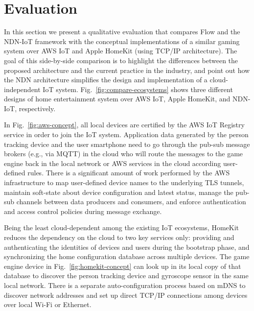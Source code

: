 \section{Evaluation}
\label{sec:eval}

In this section we present a qualitative evaluation that compares Flow and the NDN-IoT framework with the conceptual implementations of a similar gaming system over AWS IoT and Apple HomeKit (using TCP/IP architecture).
The goal of this side-by-side comparison is to highlight the differences between the proposed architecture and the current practice in the industry, and point out how the NDN architecture simplifies the design and implementation of a cloud-independent IoT system.
Fig.~\ref{fig:compare-ecosystems} shows three different designs of home entertainment system over AWS IoT, Apple HomeKit, and NDN-IoT, respectively.

\begin{figure*}[!t]
\centering
{}
\hfil
{}
\hfil
{}
\caption{Comparison of IoT-enabled home entertainment systems over different ecosystems.}
\label{fig:compare-ecosystems}
\end{figure*}

In Fig.~\ref{fig:aws-concept}, all local devices are certified by the AWS IoT Registry service in order to join the IoT system.
Application data generated by the person tracking device and the user smartphone need to go through the pub-sub message brokers (e.g., via MQTT) in the cloud who will route the messages to the game engine back in the local network or AWS services in the cloud according user-defined rules.
There is a significant amount of work performed by the AWS infrastructure to map user-defined device names to the underlying TLS tunnels, maintain soft-state about device configuration and latest status, manage the pub-sub channels between data producers and consumers, and enforce authentication and access control policies during message exchange.

Being the least cloud-dependent among the existing IoT ecosystems, HomeKit reduces the dependency on the cloud to two key services only:
providing and authenticating the identities of devices and users during the bootstrap phase, and synchronizing the home configuration database across multiple devices.
The game engine device in Fig.~\ref{fig:homekit-concept} can look up in its local copy of that database to discover the person tracking device and gyroscope sensor in the same local network.
There is a separate auto-configuration process based on mDNS to discover network addresses and set up direct TCP/IP connections among devices over local Wi-Fi or Ethernet.

